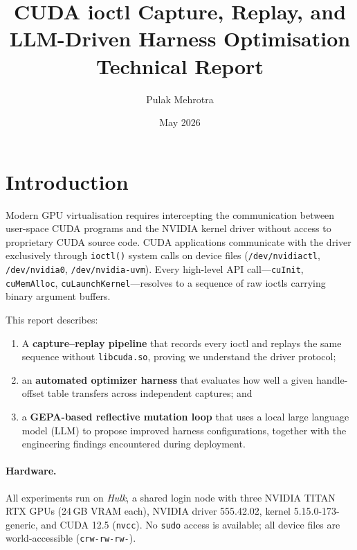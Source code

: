 \documentclass[11pt,a4paper]{article}
\title{\textbf{CUDA ioctl Capture, Replay, and LLM-Driven Harness Optimisation}\\[0.4em]
       \large Technical Report}
\author{Pulak Mehrotra}
\date{May 2026}
\begin{document}
\maketitle
\tableofcontents
\bigskip

\section{Introduction}

Modern GPU virtualisation requires intercepting the communication between
user-space CUDA programs and the NVIDIA kernel driver without access to
proprietary CUDA source code.
CUDA applications communicate with the driver exclusively through
\texttt{ioctl()} system calls on device files
(\texttt{/dev/nvidiactl}, \texttt{/dev/nvidia0}, \texttt{/dev/nvidia-uvm}).
Every high-level API call---\texttt{cuInit}, \texttt{cuMemAlloc},
\texttt{cuLaunchKernel}---resolves to a sequence of raw ioctls carrying
binary argument buffers.

This report describes:
\begin{enumerate}[leftmargin=*]
  \item A \textbf{capture--replay pipeline} that records every ioctl and
        replays the same sequence without \texttt{libcuda.so}, proving we
        understand the driver protocol;
  \item an \textbf{automated optimizer harness} that evaluates how well a
        given handle-offset table transfers across independent captures; and
  \item a \textbf{GEPA-based reflective mutation loop} that uses a local
        large language model (LLM) to propose improved harness configurations,
        together with the engineering findings encountered during deployment.
\end{enumerate}

\paragraph{Hardware.}
All experiments run on \emph{Hulk}, a shared login node with three NVIDIA
TITAN RTX GPUs (24\,GB VRAM each), NVIDIA driver 555.42.02, kernel
5.15.0-173-generic, and CUDA 12.5 (\texttt{nvcc}).
No \texttt{sudo} access is available; all device files are world-accessible
(\texttt{crw-rw-rw-}).

\end{document}
